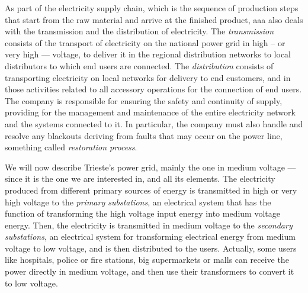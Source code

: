 As part of the electricity supply chain,
which is the sequence of production steps that start from the raw material and arrive at the finished product, %
\acrshort{aaa} also deals with the transmission and the distribution of electricity. The \emph{transmission} consists of the transport of electricity on the national power grid in high -- or very high --- voltage, to deliver it in the regional distribution networks to local distributors to which end users are connected. The \emph{distribution} consists of transporting electricity on local networks for delivery to end customers, and in those activities related to all accessory operations for the connection of end users. The company is responsible for ensuring the safety and continuity of supply, providing for the management and maintenance of the entire electricity network and the systems connected to it. In particular, the company must also handle and resolve any blackouts deriving from faults that may occur on the power line, something called \emph{restoration process}.

We will now describe Trieste's power grid, mainly the one in medium voltage --- since it is the one we are interested in, and all its elements.  The electricity produced from different primary sources of energy is transmitted in high or very high voltage to the \emph{primary substations}, an electrical system that has the function of transforming the high voltage input energy into medium voltage energy. Then, the electricity is transmitted in medium voltage to the \emph{secondary substations}, an electrical system for transforming electrical energy from medium voltage to low voltage, and is then distributed to the users. Actually, some users like hospitals, police or fire stations, big supermarkets or malls can receive the power directly in medium voltage, and then use their transformers to convert it to low voltage.


